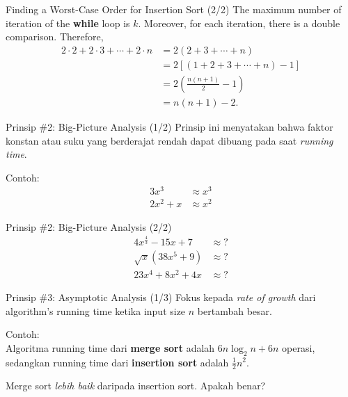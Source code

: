 \documentclass[pdf]{beamer}
\theoremstyle{mystyle}
\begin{document}
\begin{frame}{Finding a Worst-Case Order for Insertion Sort (2/2)}
		The maximum number of iteration of the \textbf{while} loop is $k$. Moreover, for each iteration, there is a double comparison. Therefore,
		\begin{align*}
			2 \cdot 2 + 2 \cdot 3 + \cdots + 2 \cdot n &= 2(2 + 3 + \cdots + n) \\
			                                           &= 2[(1+2+3 + \cdots + n) - 1] \\
			                                           &= 2\left( \frac{n(n+1)}{2} - 1 \right) \\
			                                           &= n(n+1) -2.			                                           
		\end{align*}	
\end{frame}

\begin{frame}{Prinsip \#2: Big-Picture Analysis (1/2)}
	Prinsip ini menyatakan bahwa faktor konstan atau suku yang berderajat rendah dapat dibuang pada saat \textit{running time}.
	
	\bigskip
	
	Contoh:
	\begin{align*}
		3x^3 &\approx x^3  \\
		2x^2+x &\approx x^2				
	\end{align*}		
\end{frame}

\begin{frame}{Prinsip \#2: Big-Picture Analysis (2/2)}
	\begin{align*}
		4x^{\frac{4}{3}}-15x + 7 &\approx ? \\
		\sqrt{x}(38x^{5} + 9) &\approx ? \\
		23x^4 + 8 x^2 + 4x &\approx ?
	\end{align*}
\end{frame}

\begin{frame}{Prinsip \#3: Asymptotic Analysis (1/3)}
	Fokus kepada \textit{rate of growth} dari algorithm's running time ketika input size $n$ bertambah besar.
	
	\bigskip	
	
	Contoh: \\
	Algoritma running time dari \textbf{merge sort} adalah $6n \log_{2}{n} + 6n$ operasi, sedangkan running time dari \textbf{insertion sort} adalah $\frac{1}{2}n^2$.

	\bigskip
	
	Merge sort \textit{lebih baik} daripada insertion sort. Apakah benar? 		
\end{frame}
\end{document}
